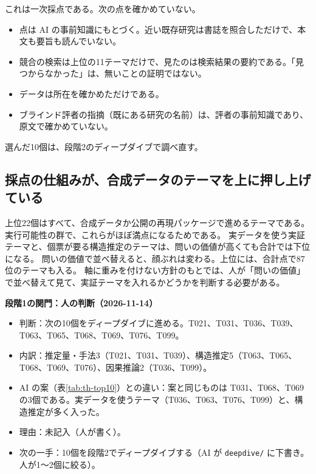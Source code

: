 \documentclass[a4paper,10pt]{ltjsarticle}
\begin{document}


\begin{pitfall}
これは一次採点である。次の点を確かめていない。
\begin{itemize}[leftmargin=*]
  \item 点は AI の事前知識にもとづく。近い既存研究は書誌を照合しただけで、本文も要旨も読んでいない。
  \item 競合の検索は上位の11テーマだけで、見たのは検索結果の要約である。「見つからなかった」は、無いことの証明ではない。
  \item データは所在を確かめただけである。
  \item ブラインド評者の指摘（既にある研究の名前）は、評者の事前知識であり、原文で確かめていない。
\end{itemize}
選んだ10個は、段階2のディープダイブで調べ直す。
\end{pitfall}

\subsection{採点の仕組みが、合成データのテーマを上に押し上げている}

上位22個はすべて、合成データか公開の再現パッケージで進めるテーマである。実行可能性の群で、これらがほぼ満点になるためである。
実データを使う実証テーマと、個票が要る構造推定のテーマは、問いの価値が高くても合計では下位になる。
問いの価値で並べ替えると、顔ぶれは変わる。上位には、合計点で87位のテーマも入る。
軸に重みを付けない方針のもとでは、人が「問いの価値」で並べ替えて見て、実証テーマを入れるかどうかを判断する必要がある。

\begin{decision}
\textbf{段階1の関門：人の判断（2026-11-14）}
\begin{itemize}[leftmargin=*]
  \item 判断：次の10個をディープダイブに進める。T021、T031、T036、T039、T063、T065、T068、T069、T076、T099。
  \item 内訳：推定量・手法3（T021、T031、T039）、構造推定5（T063、T065、T068、T069、T076）、因果推論2（T036、T099）。
  \item AI の案（表\ref{tab:th-top10}）との違い：案と同じものは T031、T068、T069 の3個である。実データを使うテーマ（T036、T063、T076、T099）と、構造推定が多く入った。
  \item 理由：未記入（人が書く）。
  \item 次の一手：10個を段階2でディープダイブする（AI が \texttt{deepdive/} に下書き。人が1〜2個に絞る）。
\end{itemize}
\end{decision}
\end{document}
